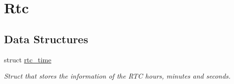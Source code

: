 \hypertarget{group__rtc}{}\section{Rtc}
\label{group__rtc}
\subsection*{Data Structures}
\begin{DoxyCompactItemize}
\item 
struct \hyperlink{structrtc__time}{rtc\+\_\+time}
\begin{DoxyCompactList}\small\item\em Struct that stores the information of the R\+TC hours, minutes and seconds. \end{DoxyCompactList}\end{DoxyCompactItemize}
